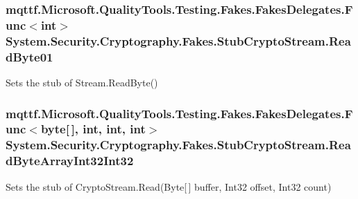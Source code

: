 \hypertarget{class_system_1_1_security_1_1_cryptography_1_1_fakes_1_1_stub_crypto_stream_a71d221a727ddaee5e5719430b045d7e0}{
\subsubsection[{Read\-Byte01}]{\setlength{\rightskip}{0pt plus 5cm}mqttf.\-Microsoft.\-Quality\-Tools.\-Testing.\-Fakes.\-Fakes\-Delegates.\-Func$<$int$>$ System.\-Security.\-Cryptography.\-Fakes.\-Stub\-Crypto\-Stream.\-Read\-Byte01}}\label{class_system_1_1_security_1_1_cryptography_1_1_fakes_1_1_stub_crypto_stream_a71d221a727ddaee5e5719430b045d7e0}


Sets the stub of Stream.\-Read\-Byte()

\hypertarget{class_system_1_1_security_1_1_cryptography_1_1_fakes_1_1_stub_crypto_stream_ac09c8e944c1aa3aa5247c82712f85169}{
\subsubsection[{Read\-Byte\-Array\-Int32\-Int32}]{\setlength{\rightskip}{0pt plus 5cm}mqttf.\-Microsoft.\-Quality\-Tools.\-Testing.\-Fakes.\-Fakes\-Delegates.\-Func$<$byte\mbox{[}$\,$\mbox{]}, int, int, int$>$ System.\-Security.\-Cryptography.\-Fakes.\-Stub\-Crypto\-Stream.\-Read\-Byte\-Array\-Int32\-Int32}}\label{class_system_1_1_security_1_1_cryptography_1_1_fakes_1_1_stub_crypto_stream_ac09c8e944c1aa3aa5247c82712f85169}


Sets the stub of Crypto\-Stream.\-Read(\-Byte\mbox{[}$\,$\mbox{]} buffer, Int32 offset, Int32 count)

